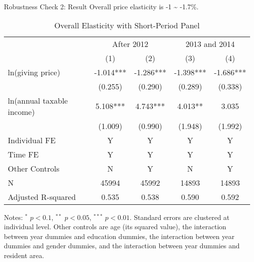 \documentclass[
  ignorenonframetext,
  aspectratio=169,
]{beamer}
\begin{document}
\begin{frame}{Robustness Check 2: Result}
\protect\hypertarget{robustness-check-2-result}{}
Overall price elasticity is -1 \textasciitilde{} -1.7\%.

\begin{table}

\caption{\label{tab:ShortOverall}Overall Elasticity with Short-Period Panel}
\centering
\fontsize{7}{9}\selectfont
\begin{threeparttable}
\begin{tabular}[t]{lcccc}
\toprule
\multicolumn{1}{c}{ } & \multicolumn{2}{c}{After 2012} & \multicolumn{2}{c}{2013 and 2014} \\
\cmidrule(l{3pt}r{3pt}){2-3} \cmidrule(l{3pt}r{3pt}){4-5}
 & (1) & (2) & (3) & (4)\\
\midrule
ln(giving price) & -1.014*** & -1.286*** & -1.398*** & -1.686***\\
 & (0.255) & (0.290) & (0.289) & (0.338)\\
ln(annual taxable income) & 5.108*** & 4.743*** & 4.013** & 3.035\\
 & (1.009) & (0.990) & (1.948) & (1.992)\\
Individual FE & Y & Y & Y & Y\\
Time FE & Y & Y & Y & Y\\
Other Controls & N & Y & N & Y\\
N & 45994 & 45992 & 14893 & 14893\\
Adjusted R-squared & 0.535 & 0.538 & 0.590 & 0.592\\
\bottomrule
\end{tabular}
\begin{tablenotes}
\item Notes: $^{*}$ $p < 0.1$, $^{**}$ $p < 0.05$, $^{***}$ $p < 0.01$. Standard errors are clustered at individual level. Other controls are age (its squared value), the interaction between year dummies and education dummies, the interaction between year dummies and gender dummies, and the interaction between year dummies and resident area.
\end{tablenotes}
\end{threeparttable}
\end{table}
\end{frame}
\end{document}
